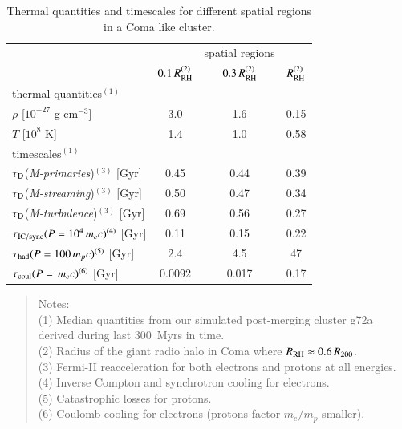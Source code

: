 \documentclass[fleqn,usenatbib,useAMS]{mnras}
\newcommand{\Mstream}{{\it M-streaming}\xspace}
\newcommand{\Mflatturb}{{\it M-turbulence}\xspace}
\newcommand{\Mprimary}{{\it M-primaries}\xspace}
\newcommand{\RH}{R_\rmn{RH}}
\begin{document}
\begin{table}
  \caption{Thermal quantities and timescales for different spatial
    regions in a Coma like cluster.}
\begin{tabular}{l c  c c}
\hline
\hline
& & spatial regions & \\
 & $0.1\,\RH^{(2)}$ & $0.3\,\RH^{(2)}$ & $\RH^{(2)}$   \\
\hline
thermal quantities$^{(1)}$ & & & \\
$\rho$ [$10^{-27}$ g cm$^{-3}$] & 3.0 & 1.6 & 0.15 \\
$T$ [$10^{8}$ K] & 1.4 & 1.0 & 0.58 \\
\hline
timescales$^{(1)}$ & & & \\
$\tau_{\mathrm{D}}$(\Mprimary)$^{(3)}$ [Gyr] & 0.45 & 0.44 & 0.39 \\
$\tau_{\mathrm{D}}$(\Mstream)$^{(3)}$  [Gyr] & 0.50 & 0.47 & 0.34 \\
$\tau_{\mathrm{D}}$(\Mflatturb)$^{(3)}$  [Gyr] & 0.69 & 0.56 & 0.27 \\
$\tau_{\mathrm{IC/sync}}(P=10^4\,m_ec)^{(4)}$ [Gyr] & 0.11 & 0.15 & 0.22 \\
$\tau_{\mathrm{had}}(P=100\,m_pc)^{(5)}$ [Gyr] & 2.4 & 4.5 & 47 \\
$\tau_{\mathrm{coul}}(P=\,m_ec)^{(6)}$  [Gyr] & 0.0092 & 0.017 & 0.17 \\
\hline
\end{tabular}
\begin{quote}
 Notes: \\ 
 (1) Median quantities from our simulated post-merging cluster g72a derived 
 during last 300~Myrs in time. \\
 (2) Radius of the giant radio halo in Coma where $\RH\approx0.6\,R_{200}$.\\
 (3) Fermi-II reacceleration for both electrons and protons at all energies.\\
 (4) Inverse Compton and synchrotron cooling for electrons.\\
 (5) Catastrophic losses for protons.\\
 (6) Coulomb cooling for electrons (protons factor $m_e/m_p$ smaller).\\
 \label{tab:timescales}
  \end{quote}
\end{table} 
\end{document}

